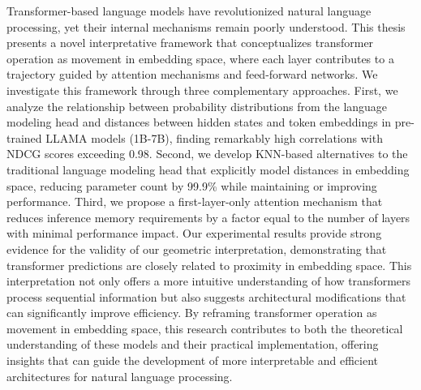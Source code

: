 Transformer-based language models have revolutionized natural language processing, yet their internal mechanisms remain poorly understood. This thesis presents a novel interpretative framework that conceptualizes transformer operation as movement in embedding space, where each layer contributes to a trajectory guided by attention mechanisms and feed-forward networks. We investigate this framework through three complementary approaches. First, we analyze the relationship between probability distributions from the language modeling head and distances between hidden states and token embeddings in pre-trained LLAMA models (1B-7B), finding remarkably high correlations with NDCG scores exceeding 0.98. Second, we develop KNN-based alternatives to the traditional language modeling head that explicitly model distances in embedding space, reducing parameter count by 99.9\% while maintaining or improving performance. Third, we propose a first-layer-only attention mechanism that reduces inference memory requirements by a factor equal to the number of layers with minimal performance impact. Our experimental results provide strong evidence for the validity of our geometric interpretation, demonstrating that transformer predictions are closely related to proximity in embedding space. This interpretation not only offers a more intuitive understanding of how transformers process sequential information but also suggests architectural modifications that can significantly improve efficiency. By reframing transformer operation as movement in embedding space, this research contributes to both the theoretical understanding of these models and their practical implementation, offering insights that can guide the development of more interpretable and efficient architectures for natural language processing.
